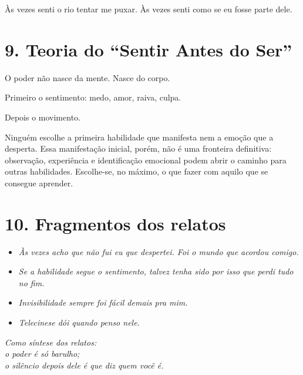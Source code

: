 Às vezes senti o rio tentar me puxar.  
Às vezes senti como se eu fosse parte dele.

\section*{9. Teoria do ``Sentir Antes do Ser''}

O poder não nasce da mente.  
Nasce do corpo.  

Primeiro o sentimento:  
medo, amor, raiva, culpa.  

Depois o movimento.  

Ninguém escolhe a primeira habilidade que manifesta nem a emoção que a desperta.
Essa manifestação inicial, porém, não é uma fronteira definitiva: observação, experiência e identificação emocional podem abrir o caminho para outras habilidades.
Escolhe-se, no máximo, o que fazer com aquilo que se consegue aprender.

\section*{10. Fragmentos dos relatos}

\begin{itemize}
    \item \textit{Às vezes acho que não fui eu que despertei. Foi o mundo que acordou comigo.}
    \item \textit{Se a habilidade segue o sentimento, talvez tenha sido por isso que perdi tudo no fim.}
    \item \textit{Invisibilidade sempre foi fácil demais pra mim.}
    \item \textit{Telecinese dói quando penso nele.}
\end{itemize}

\begin{center}
\textit{Como síntese dos relatos:\\
o poder é só barulho;\\
o silêncio depois dele é que diz quem você é.}
\end{center}
